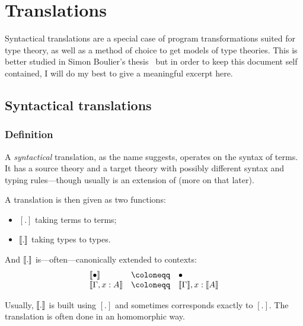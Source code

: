 \chapter{Translations}

Syntactical translations are a special case of program transformations suited
for type theory, as well as a method of choice to get models of type theories.
This is better studied in Simon Boulier's
thesis~
but in order to keep this document self contained, I will do my best to give a
meaningful excerpt here.

\section{Syntactical translations}

\subsection{Definition}

A \emph{syntactical} translation, as the name suggests, operates on the syntax
of terms. It has a source theory \cS and a target theory \cT with possibly
different syntax and typing rules---though usually \cS is an extension of \cT
(more on that later).

A translation is then given as two functions:
\begin{itemize}
  \item \([.]\) taking \cS terms to \cT terms;
  \item \(\llbracket . \rrbracket\) taking \cS types to \cT types.
\end{itemize}
And \(\llbracket . \rrbracket\) is---often---canonically extended to contexts:
\[
\begin{array}{lcl}
  \transl{\ctxempty} &\coloneqq& \ctxempty \\
  \transl{\Ga, x : A} &\coloneqq& \transl{\Ga}, x : \transl{A}
\end{array}
\]

Usually, \(\llbracket . \rrbracket\) is built using \([.]\) and sometimes corresponds
exactly to \([.]\).
The translation is often done in an homomorphic way.

